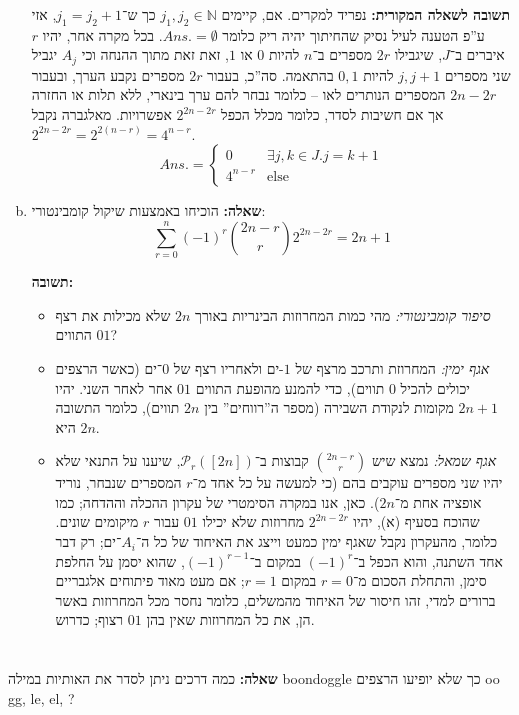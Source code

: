 \documentclass[]{article}
\newcommand\sen   {\selectlanguage{english}}
\newcommand\she   {\selectlanguage{hebrew}}
\newcommand\del   {$ \!\! $}
\newcommand\N     {\mathbb{N}}
\newcommand\ps    {\mathcal{P}}
\newcommand\other {\text{else}}
\newcommand\ans   {\mathit{Ans.}}
\begin{document}
\begin{enumerate}[(a)]
		
		
		\textbf{תשובה לשאלה המקורית: }נפריד למקרים. אם, קיימים $j_1, j_2 \in \N$ כך ש־$j_1 = j_2 + 1$, אזי ע''פ הטענה לעיל נסיק שהחיתוך יהיה ריק כלומר $\ans = \emptyset$. בכל מקרה אחר, יהיו $r$ איברים ב־$J$, שיגבילו $2r $ מספרים ב־$n$ להיות $0$ או $1$, זאת זאת מתוך ההנחה וכי $A_j$ יגביל שני מספרים $j, j + 1$ להיות $0, 1$ בהתאמה. סה''כ, בעבור $2r$ מספרים נקבע הערך, ובעבור $2n - 2r$ המספרים הנותרים לאו – כלומר נבחר להם ערך בינארי, ללא תלות או החזרה אך אם חשיבות לסדר, כלומר מכלל הכפל $2^{2n - 2r}$ אפשרויות. מאלגברה נקבל $2^{2n - 2r} = 2^{2(n - r)} = 4^{n - r}$. 
		\[ \ans = \begin{cases}
			0 & \exists j, k \in J. j = k + 1 \\
			4^{n - r} & \other
		\end{cases} \]
		
		
		\item \textbf{שאלה: }הוכיחו באמצעות שיקול קומבינטורי: 
		\[ \sum_{r = 0}^{n}(-1)^r\binom{2n - r}{r}2^{2n - 2r} = 2n + 1 \]
		
		\textbf{תשובה: }
		\begin{itemize}
			\item \textit{סיפור קומבינטורי: }מהי כמות המחרוזות הבינריות באורך $2n$ שלא מכילות את רצף התווים $01$?
			\item \textit{אגף ימין: }המחרוזת ותרכב מרצף של $1$-ים ולאחריו רצף של $0$־ים (כאשר הרצפים יכולים להכיל $0$ תווים), כדי להמנע מהופעת התווים $01$ אחר לאחר השני. יהיו $2n + 1$ מקומות לנקודת השבירה (מספר ה''רווחים'' בין $2n$ תווים), כלומר התשובה היא $2n$. 
			\item \textit{אגף שמאל: }נמצא שיש $\binom{2n - r}{r}$ קבוצות ב־$\ps_r([2n])$, שיענו על התנאי שלא יהיו שני מספרים עוקבים בהם (כי למעשה על כל אחד מ־$r$ המספרים שנבחר, נוריד אופציה אחת מ־$2n$). כאן, אנו במקרה הסימטרי של עקרון ההכלה וההדחה; כמו שהוכח בסעיף (א), יהיו $2^{2n - 2r}$ מחרוזות שלא יכילו $01$ עבור $r$ מיקומים שונים. כלומר, מהעקרון נקבל שאגף ימין כמעט וייצג את האיחוד של כל ה־$A_i$־ים; רק דבר אחד השתנה, והוא הכפל ב־$(-1)^{r}$ במקום ב־$(-1)^{r - 1}$, שהוא יסמן על החלפת סימן, והתחלת הסכום מ־$r = 0$ במקום $r = 1$; אם מעט מאוד פיתוחים אלגבריים ברורים למדי, זהו חיסור של האיחוד מהמשלים, כלומר נחסר מכל המחרוזות באשר הן, את כל המחרוזות שאין בהן $01$ רצוף; כדרוש. 
		\end{itemize}
	\end{enumerate}
	\section{} %
	\textbf{שאלה: }כמה דרכים ניתן לסדר את האותיות במילה \sen boondoggle \she כך שלא יופיעו הרצפים \sen oo gg, le, el, \she\del? 
	
\end{document}
